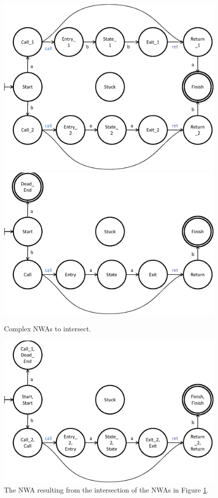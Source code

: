 \documentclass{llncs}
\begin{document}
\begin{figure}[htbp]
  \centering
    \includegraphics[width=12cm]{Figures/Figure7a.eps}
    \includegraphics[width=12cm]{Figures/Figure7b.eps}
  \caption{Complex NWAs to intersect.}
  \label{Fig:Intersect3}
\end{figure}

\begin{figure}[htbp]
  \centering
    \includegraphics[width=12cm]{Figures/Figure8.eps}
  \caption{The NWA resulting from the intersection of the NWAs in Figure \ref{Fig:Intersect3}.}
  \label{Fig:Intersect4}
\end{figure}
\end{document}
